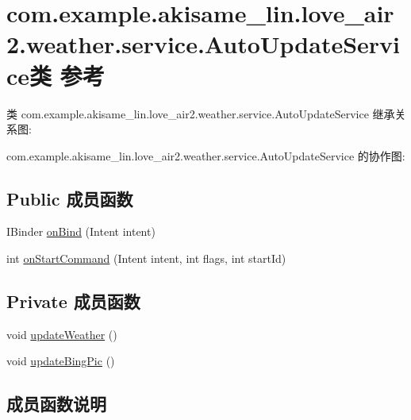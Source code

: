 \hypertarget{classcom_1_1example_1_1akisame__lin_1_1love__air2_1_1weather_1_1service_1_1_auto_update_service}{}\section{com.\+example.\+akisame\+\_\+lin.\+love\+\_\+air2.\+weather.\+service.\+Auto\+Update\+Service类 参考}
\label{classcom_1_1example_1_1akisame__lin_1_1love__air2_1_1weather_1_1service_1_1_auto_update_service}


类 com.\+example.\+akisame\+\_\+lin.\+love\+\_\+air2.\+weather.\+service.\+Auto\+Update\+Service 继承关系图\+:


com.\+example.\+akisame\+\_\+lin.\+love\+\_\+air2.\+weather.\+service.\+Auto\+Update\+Service 的协作图\+:
\subsection*{Public 成员函数}
\begin{DoxyCompactItemize}
\item 
I\+Binder \mbox{\hyperlink{classcom_1_1example_1_1akisame__lin_1_1love__air2_1_1weather_1_1service_1_1_auto_update_service_a5ac0dc10b1584f449cc5623f7cf0d28a}{on\+Bind}} (Intent intent)
\item 
int \mbox{\hyperlink{classcom_1_1example_1_1akisame__lin_1_1love__air2_1_1weather_1_1service_1_1_auto_update_service_af646463af8610a3da3e159b6c83cccc5}{on\+Start\+Command}} (Intent intent, int flags, int start\+Id)
\end{DoxyCompactItemize}
\subsection*{Private 成员函数}
\begin{DoxyCompactItemize}
\item 
void \mbox{\hyperlink{classcom_1_1example_1_1akisame__lin_1_1love__air2_1_1weather_1_1service_1_1_auto_update_service_a6a80a8cd2f6a6d64bfd005318b87b017}{update\+Weather}} ()
\item 
void \mbox{\hyperlink{classcom_1_1example_1_1akisame__lin_1_1love__air2_1_1weather_1_1service_1_1_auto_update_service_aab8078b9b33e624d6c0d51eb80532d75}{update\+Bing\+Pic}} ()
\end{DoxyCompactItemize}


\subsection{成员函数说明}
\mbox{\label{classcom_1_1example_1_1akisame__lin_1_1love__air2_1_1weather_1_1service_1_1_auto_update_service_a5ac0dc10b1584f449cc5623f7cf0d28a}} 

